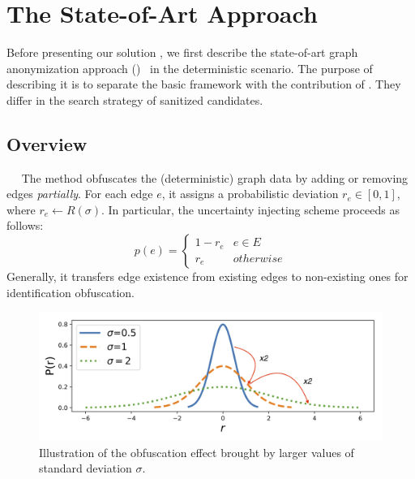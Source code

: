 \section{The State-of-Art Approach}
\label{sec:soa}
Before presenting our solution {\methodName}, we first describe the state-of-art graph anonymization approach ({\soaName})~\cite{Boldi_Injecting_2012} in the deterministic scenario. 
The purpose of describing it is to separate the basic framework with the contribution of {\methodName}. 
They differ in the search strategy of sanitized candidates.  

\subsection{Overview}~~
The {\soaName} method obfuscates the (deterministic) graph data by adding or removing edges \emph{partially}. 
For each edge $e$, it assigns a probabilistic deviation $r_{e} \in [0,1]$, where $r_{e} \leftarrow R(\sigma)$. 
In particular, the uncertainty injecting scheme proceeds as follows:
\begin{equation}
    p(e) =
    \begin{cases}
         1-r_{e}  & e \in E \\
         r_{e}    & otherwise 
    \end{cases}
    \label{eq:inject}
\end{equation}
Generally, it transfers edge existence from existing edges to non-existing ones for identification obfuscation.   

\begin{figure}[htb]
  \centering
        \includegraphics[width=0.8\linewidth]{ill/std_2.jpg}
  \vspace{-5pt}
  \caption{Illustration of the obfuscation effect brought by larger values of standard deviation $\sigma$.}
  \vspace{-5pt}
  \label{fig:std}
\end{figure} 

